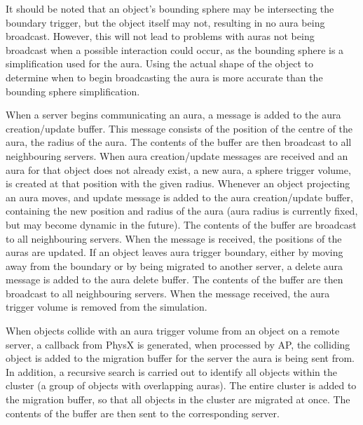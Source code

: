 It should be noted that an object's bounding sphere may be intersecting the boundary trigger, but the object itself may not, resulting in no aura being broadcast. However, this will not lead to problems with auras not being broadcast when a possible interaction could occur, as the bounding sphere is a simplification used for the aura. Using the actual shape of the object to determine when to begin broadcasting the aura is more accurate than the bounding sphere simplification.

When a server begins communicating an aura, a message is added to the aura creation/update buffer. This message consists of the position of the centre of the aura, the radius of the aura. %
The contents of the buffer are then broadcast to all neighbouring servers. When aura creation/update messages are received and an aura for that object does not already exist, a new aura, a sphere trigger volume, is created at that position with the given radius.
Whenever an object projecting an aura moves, and update message is added to the aura creation/update buffer, containing the new position and radius of the aura (aura radius is currently fixed, but may become dynamic in the future). The contents of the buffer are broadcast to all neighbouring servers. When the message is received, the positions of the auras are updated. 
If an object leaves aura trigger boundary, either by moving away from the boundary or by being migrated to another server, a delete aura message is added to the aura delete buffer. The contents of the buffer are then broadcast to all neighbouring servers. When the message received, the aura trigger volume is removed from the simulation.

When objects collide with an aura trigger volume from an object on a remote server, a callback from PhysX is generated, when processed by AP, the colliding object is added to the migration buffer for the server the aura is being sent from. In addition, a recursive search is carried out to identify all objects within the cluster (a group of objects with overlapping auras). The entire cluster is added to the migration buffer, so that all objects in the cluster are migrated at once. The contents of the buffer are then sent to the corresponding server.

